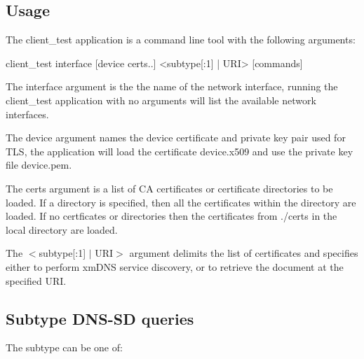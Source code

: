 \subsection*{Usage }

The {\ttfamily client\+\_\+test} application is a command line tool with the following arguments\+: \begin{DoxyVerb}client_test interface [device certs..] <subtype[:1] | URI> [commands]
\end{DoxyVerb}


The {\ttfamily interface} argument is the the name of the network interface, running the {\ttfamily client\+\_\+test} application with no arguments will list the available network interfaces.

The {\ttfamily device} argument names the device certificate and private key pair used for T\+LS, the application will load the certificate {\ttfamily device.\+x509} and use the private key file {\ttfamily device.\+pem}.

The {\ttfamily certs} argument is a list of CA certificates or certificate directories to be loaded. If a directory is specified, then all the certificates within the directory are loaded. If no certficates or directories then the certificates from {\ttfamily ./certs} in the local directory are loaded.

The {\ttfamily $<$subtype\mbox{[}\+:1\mbox{]} $\vert$ U\+RI$>$} argument delimits the list of certificates and specifies either to perform xm\+D\+NS service discovery, or to retrieve the document at the specified U\+RI.

\subsection*{Subtype D\+N\+S-\/\+SD queries }

The {\ttfamily subtype} can be one of\+:


